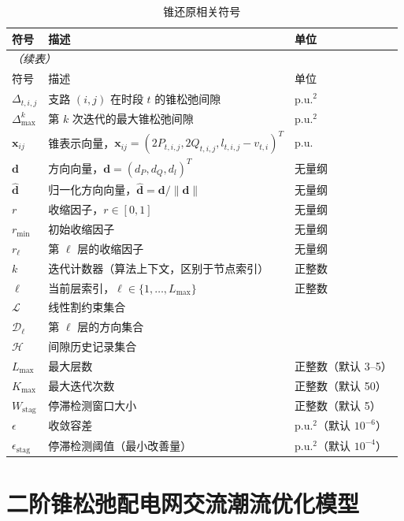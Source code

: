\documentclass[12pt,a4paper]{article}
\begin{document}
\begin{longtable}{p{3cm}p{7cm}p{3cm}}
\caption{锥还原相关符号}\label{tab:cone_recovery} \\
\toprule
符号 & 描述 & 单位 \\
\midrule
\endfirsthead
\multicolumn{3}{l}{\small\itshape（续表）} \\
\toprule
符号 & 描述 & 单位 \\
\midrule
\endhead
\bottomrule
\endlastfoot
$\Delta_{t,i,j}$ & 支路 $(i,j)$ 在时段 $t$ 的锥松弛间隙 & p.u.$^2$ \\
$\Delta^k_{\max}$ & 第 $k$ 次迭代的最大锥松弛间隙 & p.u.$^2$ \\
$\mathbf{x}_{ij}$ & 锥表示向量，$\mathbf{x}_{ij} = (2P_{t,i,j}, 2Q_{t,i,j}, l_{t,i,j}-v_{t,i})^T$ & p.u. \\
$\mathbf{d}$ & 方向向量，$\mathbf{d} = (d_P, d_Q, d_l)^T$ & 无量纲 \\
$\hat{\mathbf{d}}$ & 归一化方向向量，$\hat{\mathbf{d}} = \mathbf{d}/\|\mathbf{d}\|$ & 无量纲 \\
$r$ & 收缩因子，$r \in [0, 1]$ & 无量纲 \\
$r_{\min}$ & 初始收缩因子 & 无量纲 \\
$r_\ell$ & 第 $\ell$ 层的收缩因子 & 无量纲 \\
$k$ & 迭代计数器（算法上下文，区别于节点索引） & 正整数 \\
$\ell$ & 当前层索引，$\ell \in \{1,\ldots,L_{\max}\}$ & 正整数 \\
$\mathcal{L}$ & 线性割约束集合 & \textendash{} \\
$\mathcal{D}_\ell$ & 第 $\ell$ 层的方向集合 & \textendash{} \\
$\mathcal{H}$ & 间隙历史记录集合 & \textendash{} \\
$L_{\max}$ & 最大层数 & 正整数（默认 3--5） \\
$K_{\max}$ & 最大迭代次数 & 正整数（默认 50） \\
$W_{\text{stag}}$ & 停滞检测窗口大小 & 正整数（默认 5） \\
$\epsilon$ & 收敛容差 & p.u.$^2$（默认 $10^{-6}$） \\
$\epsilon_{\text{stag}}$ & 停滞检测阈值（最小改善量） & p.u.$^2$（默认 $10^{-4}$） \\
\end{longtable}

\section{二阶锥松弛配电网交流潮流优化模型}
\end{document}
